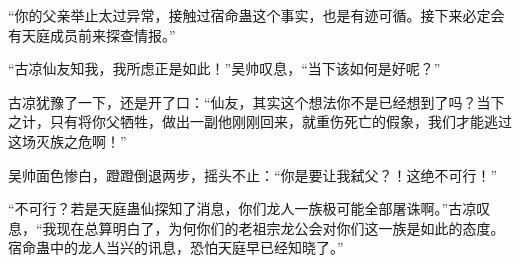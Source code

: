 \begin{this_body}
“你的父亲举止太过异常，接触过宿命蛊这个事实，也是有迹可循。接下来必定会有天庭成员前来探查情报。”

“古凉仙友知我，我所虑正是如此！”吴帅叹息，“当下该如何是好呢？”

古凉犹豫了一下，还是开了口：“仙友，其实这个想法你不是已经想到了吗？当下之计，只有将你父牺牲，做出一副他刚刚回来，就重伤死亡的假象，我们才能逃过这场灭族之危啊！”

吴帅面色惨白，蹬蹬倒退两步，摇头不止：“你是要让我弑父？！这绝不可行！”

“不可行？若是天庭蛊仙探知了消息，你们龙人一族极可能全部屠诛啊。”古凉叹息，“我现在总算明白了，为何你们的老祖宗龙公会对你们这一族是如此的态度。宿命蛊中的龙人当兴的讯息，恐怕天庭早已经知晓了。”

\end{this_body}

